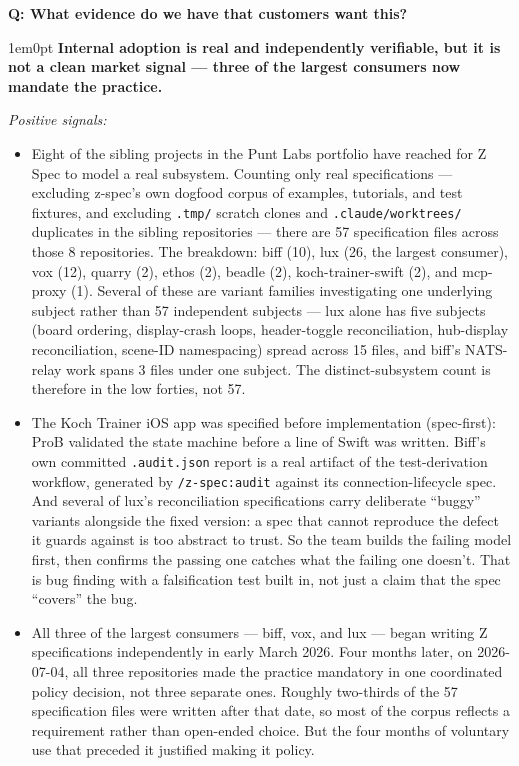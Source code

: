 \documentclass[11pt,letterpaper]{article}
\newcounter{faqnum}
\newenvironment{faqpair}[1]{%
  \needspace{4\baselineskip}%
  \vspace{0.5em}%
  \refstepcounter{faqnum}%
  \noindent\textbf{\color{SectionBlue}Q\thefaqnum: #1}\par\nopagebreak[4]%
  \vspace{0.2em}%
  \begin{adjustwidth}{1em}{0pt}%
  \setlength{\parindent}{0pt}%
}{%
  \end{adjustwidth}%
  \vspace{0.5em}%
}
\begin{document}
\begin{faqpair}{What evidence do we have that customers want this?}\label{faq:evidence}
\textbf{Internal adoption is real and independently verifiable, but it is not a clean market signal --- three of the largest consumers now mandate the practice.}

\emph{Positive signals:}
\begin{itemize}[nosep]
\item Eight of the sibling projects in the Punt Labs portfolio have reached for Z Spec to model a real subsystem. Counting only real specifications --- excluding z-spec's own dogfood corpus of examples, tutorials, and test fixtures, and excluding \texttt{.tmp/} scratch clones and \texttt{.claude/worktrees/} duplicates in the sibling repositories --- there are 57 specification files across those 8 repositories. The breakdown: biff (10), lux (26, the largest consumer), vox (12), quarry (2), ethos (2), beadle (2), koch-trainer-swift (2), and mcp-proxy (1). Several of these are variant families investigating one underlying subject rather than 57 independent subjects --- lux alone has five subjects (board ordering, display-crash loops, header-toggle reconciliation, hub-display reconciliation, scene-ID namespacing) spread across 15 files, and biff's NATS-relay work spans 3 files under one subject. The distinct-subsystem count is therefore in the low forties, not 57.
\item The Koch Trainer iOS app was specified before implementation (spec-first): ProB validated the state machine before a line of Swift was written. Biff's own committed \texttt{.audit.json} report is a real artifact of the test-derivation workflow, generated by \texttt{/z-spec:audit} against its connection-lifecycle spec. And several of lux's reconciliation specifications carry deliberate ``buggy'' variants alongside the fixed version: a spec that cannot reproduce the defect it guards against is too abstract to trust. So the team builds the failing model first, then confirms the passing one catches what the failing one doesn't. That is bug finding with a falsification test built in, not just a claim that the spec ``covers'' the bug.
\item All three of the largest consumers --- biff, vox, and lux --- began writing Z specifications independently in early March 2026. Four months later, on 2026-07-04, all three repositories made the practice mandatory in one coordinated policy decision, not three separate ones. Roughly two-thirds of the 57 specification files were written after that date, so most of the corpus reflects a requirement rather than open-ended choice. But the four months of voluntary use that preceded it justified making it policy.

\end{itemize}
\end{faqpair}
\end{document}
